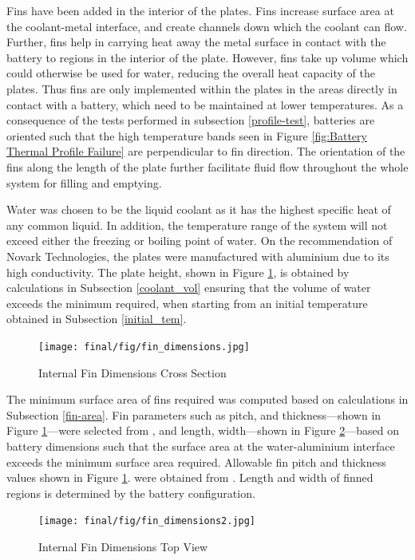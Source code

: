 \documentclass[11pt]{article}
\numberwithin{equation}{subsection} %
\begin{document}
Fins have been added in the interior of the plates. Fins increase surface area at the coolant-metal interface, and create channels down which the coolant can flow. Further, fins help in carrying heat away the metal surface in contact with the battery to regions in the interior of the plate. However, fins take up volume which could otherwise be used for water, reducing the overall heat capacity of the plates. Thus fins are only implemented within the plates in the areas directly in contact with a battery, which need to be maintained at lower temperatures. As a consequence of the tests performed in subsection \ref{profile-test}, batteries are oriented such that the high temperature bands seen in Figure \ref{fig:Battery Thermal Profile Failure} are perpendicular to fin direction. The orientation of the fins along the length of the plate further facilitate fluid flow throughout the whole system for filling and emptying.

Water was chosen to be the liquid coolant as it has the highest specific heat of any common liquid. In addition, the temperature range of the system will not exceed either the freezing or boiling point of water. On the recommendation of Novark Technologies, the plates were manufactured with aluminium due to its high conductivity. The plate height, shown in Figure \ref{fig:findim2}, is obtained by calculations in Subsection \ref{coolant_vol} ensuring that the volume of water exceeds the minimum required, when starting from an initial temperature obtained in Subsection \ref{initial_tem}.

\begin{figure}[!htb]
 \centering
	\texttt{[image: final/fig/fin\_dimensions.jpg]}
    \caption{Internal Fin Dimensions Cross Section}
    \label{fig:findim2}
\end{figure}

The minimum surface area of fins required was computed based on calculations in Subsection \ref{fin-area}. Fin parameters such as pitch, and thickness---shown in Figure \ref{fig:findim2}---were selected from \cite{novark}, and length, width---shown in Figure \ref{fig:findim1}---based on battery dimensions such that the surface area at the water-aluminium interface exceeds the minimum surface area required. Allowable fin pitch and thickness values shown in Figure \ref{fig:findim2}. were obtained from \cite{novark}. Length and width of finned regions is determined by the battery configuration.

\begin{figure}[!htb]
 \centering
	\texttt{[image: final/fig/fin\_dimensions2.jpg]}
    \caption{Internal Fin Dimensions Top View}
    \label{fig:findim1}
\end{figure}
\end{document}
